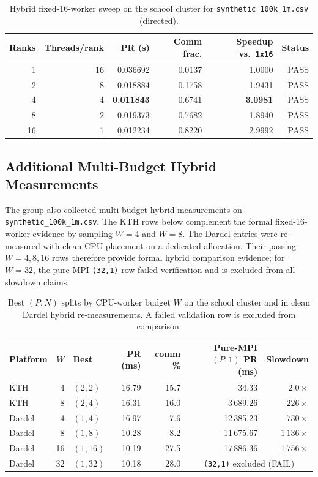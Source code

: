 \documentclass[11pt]{article}
\begin{document}
\begin{table}[H]
\centering
\caption{Hybrid fixed-16-worker sweep on the school cluster for
\texttt{synthetic\_100k\_1m.csv} (directed).}
\label{tab:wang-hybrid-synth}
\small
\begin{tabular}{rrrrrr}
\toprule
Ranks & Threads/rank & PR (s) & Comm frac. & Speedup vs.\ \texttt{1x16} & Status \\
\midrule
1  & 16 & 0.036692 & 0.0137 & 1.0000 & PASS \\
2  & 8  & 0.018884 & 0.1758 & 1.9431 & PASS \\
4  & 4  & \textbf{0.011843} & 0.6741 & \textbf{3.0981} & PASS \\
8  & 2  & 0.019373 & 0.7682 & 1.8940 & PASS \\
16 & 1  & 0.012234 & 0.8220 & 2.9992 & PASS \\
\bottomrule
\end{tabular}
\end{table}

\subsection{Additional Multi-Budget Hybrid Measurements}
\label{subsec:hybrid-multi}

The group also collected multi-budget hybrid measurements on
\texttt{synthetic\_100k\_1m.csv}. The KTH rows below complement the
formal fixed-16-worker evidence by sampling $W=4$ and $W=8$. The
Dardel entries were re-measured with clean CPU placement on a dedicated
allocation. Their passing $W=4,8,16$ rows therefore provide formal
hybrid comparison evidence; for $W=32$, the pure-MPI \texttt{(32,1)}
row failed verification and is excluded from all slowdown claims.

\begin{table}[H]
\centering
\caption{Best $(P,N)$ splits by CPU-worker budget $W$ on the school
cluster and in clean Dardel hybrid re-measurements. A failed validation
row is excluded from comparison.}
\label{tab:hybrid-multi-budget}
\small
\begin{tabular}{lr lrr rr}
\toprule
Platform & $W$ & Best & PR (ms) & comm \% & Pure-MPI $(P,1)$ PR (ms) & Slowdown \\
\midrule
KTH    & 4  & $(2,2)$  & 16.79 & 15.7 &     34.33 &     $2.0\times$ \\
KTH    & 8  & $(2,4)$  & 16.31 & 16.0 &  3\,689.26 &   $226\times$ \\
Dardel & 4  & $(1,4)$  & 16.97 &  7.6 & 12\,385.23 &   $730\times$ \\
Dardel & 8  & $(1,8)$  & 10.28 &  8.2 & 11\,675.67 & $1\,136\times$ \\
Dardel & 16 & $(1,16)$ & 10.19 & 27.5 & 17\,886.36 & $1\,756\times$ \\
Dardel & 32 & $(1,32)$ & 10.18 & 28.0 & \multicolumn{2}{c}{\texttt{(32,1)} excluded (FAIL)} \\
\bottomrule
\end{tabular}
\end{table}
\end{document}
